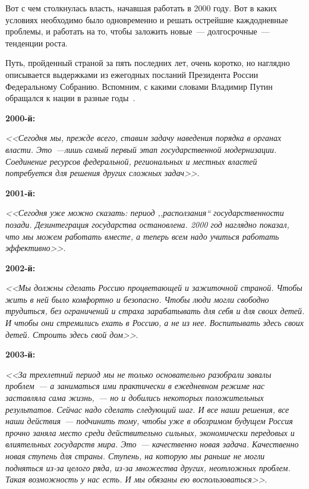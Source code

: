 \documentclass[article, 12pt, russian, oneside]{ncc}
\begin{document}
Вот с чем столкнулась власть, начавшая работать в 2000 году. Вот в
каких условиях необходимо было одновременно и решать острейшие
каждодневные проблемы, и работать на то, чтобы заложить новые~---
долгосрочные~--- тенденции роста.

Путь, пройденный страной за пять последних лет, очень коротко, но
наглядно описывается выдержками из ежегодных посланий Президента
России Федеральному Собранию. Вспомним, с какими словами Владимир
Путин обращался к нации в разные годы~\cite{NPR_Idea}.  \newline

\textbf{2000-й:}

\emph{<<Сегодня мы, прежде всего, ставим задачу наведения порядка в
  органах власти. Это~---лишь самый первый этап государственной
  модернизации. Соединение ресурсов федеральной, региональных и
  местных властей потребуется для решения других сложных
  задач>>}\cite{Putin_2000}.

\textbf{2001-й:}

\emph{<<Сегодня уже можно сказать: период ,,расползания``
  государственности позади. Дезинтеграция государства
  остановлена. 2000 год наглядно показал, что мы можем работать
  вместе, а теперь всем надо учиться работать
  эффективно>>}\cite{Putin_2001}.

\textbf{2002-й:}

\emph{<<Мы должны сделать Россию процветающей и зажиточной
  страной. Чтобы жить в ней было комфортно и безопасно. Чтобы люди
  могли свободно трудиться, без ограничений и страха зарабатывать для
  себя и для своих детей. И чтобы они стремились ехать в Россию, а не
  из нее. Воспитывать здесь своих детей. Строить здесь свой
  дом>>}\cite{Putin_2002}.

\textbf{2003-й:}

\emph{<<За трехлетний период мы не только основательно разобрали
  завалы проблем~--- а заниматься ими практически в ежедневном режиме
  нас заставляла сама жизнь,~--- но и добились некоторых положительных
  результатов. Сейчас надо сделать следующий шаг. И все наши решения,
  все наши действия~--- подчинить тому, чтобы уже в обозримом будущем
  Россия прочно заняла место среди действительно сильных, экономически
  передовых и влиятельных государств мира. Это~--- качественно новая
  задача. Качественно новая ступень для страны. Ступень, на которую мы
  раньше не могли подняться из-за целого ряда, из-за множества других,
  неотложных проблем. Такая возможность у нас есть. И мы обязаны ею
  воспользоваться>>}\cite{Putin_2003}.
\end{document}
